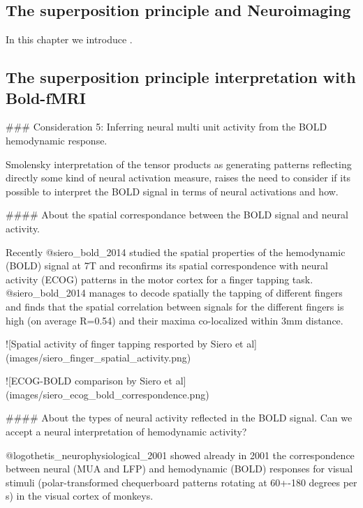 \begin{fullwidth}
\chapter{\label{ch:super_intro}
The superposition principle and Neuroimaging}
\end{fullwidth}

\begin{chabstract}

In this chapter we introduce .

\end{chabstract}


\section{The superposition principle interpretation with Bold-fMRI}

### Consideration 5: Inferring neural multi unit activity from the BOLD hemodynamic response.

Smolensky interpretation of the tensor products as generating patterns reflecting directly some kind of neural activation measure, raises the need to consider if its possible to interpret the BOLD signal in terms of neural activations and how.

#### About the spatial correspondance between the BOLD signal and neural activity.  

Recently @siero_bold_2014 studied the spatial properties of the hemodynamic (BOLD) signal at 7T and reconfirms its spatial correspondence with neural activity (ECOG) patterns in the motor cortex for a finger tapping task. @siero_bold_2014 manages to decode spatially the tapping of different fingers and finds that the spatial correlation between signals for the different fingers is high (on average R=0.54) and their maxima co-localized within 3mm distance.

![Spatial activity of finger tapping resported by Siero et al](images/siero_finger_spatial_activity.png)

![ECOG-BOLD comparison by Siero et al](images/siero_ecog_bold_correspondence.png)

#### About the types of neural activity reflected in the BOLD signal. Can we accept a neural interpretation of hemodynamic activity?

@logothetis_neurophysiological_2001 showed already in 2001 the correspondence between neural (MUA and LFP) and hemodynamic (BOLD) responses for visual stimuli (polar-transformed chequerboard patterns rotating at 60+-180 degrees per s) in the visual cortex of monkeys.

